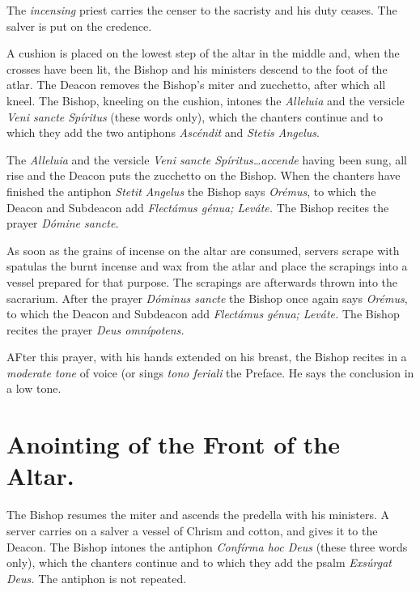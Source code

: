 \documentclass[letterpaper]{report}
\begin{document}
{The \textit{incensing} priest carries the censer to the sacristy and his duty
ceases. The salver is put on the credence.

\rubric A cushion is placed on the lowest step of the altar in the middle and,
when the crosses have been lit, the Bishop and his ministers descend to the
foot of the atlar. The Deacon removes the Bishop's miter and zucchetto, after
which all kneel. The Bishop, kneeling on the cushion, intones the
\textit{Alleluia} and the versicle \textit{Veni sancte Spíritus} (these words
only), which the chanters continue and to which they add the two antiphons
\textit{Ascéndit} and \textit{Stetis Angelus}.

\rubric The \textit{Alleluia} and the versicle \textit{Veni sancte
Spíritus\dots accende} having been sung, all rise and the Deacon puts the
zucchetto on the Bishop. When the chanters have finished the antiphon
\textit{Stetit Angelus} the Bishop says \textit{Orémus}, to which the Deacon
and Subdeacon add \textit{Flectámus génua; Leváte.} The Bishop recites the
prayer \textit{Dómine sancte.}

\rubric As soon as the grains of incense on the altar are consumed, servers
scrape with spatulas the burnt incense and wax from the atlar and place the
scrapings into a vessel prepared for that purpose. The scrapings are afterwards
thrown into the sacrarium. After the prayer \textit{Dóminus sancte} the Bishop
once again says \textit{Orémus}, to which the Deacon and Subdeacon add
\textit{Flectámus génua; Leváte.} The Bishop recites the prayer \textit{Deus
omnípotens.}

\rubric AFter this prayer, with his hands extended on his breast, the Bishop
recites in a \textit{moderate tone} of voice (or sings \textit{tono feriali}
the Preface. He says the conclusion in a low tone.

\section{Anointing of the Front of the Altar.}

\rubric The Bishop resumes the miter and ascends the predella with his
ministers. A server carries on a salver a vessel of Chrism and cotton, and
gives it to the Deacon. The Bishop intones the antiphon \textit{Confírma hoc
Deus} (these three words only), which the chanters continue and to which they
add the psalm \textit{Exsúrgat Deus.} The antiphon is not repeated.

}
\end{document}

